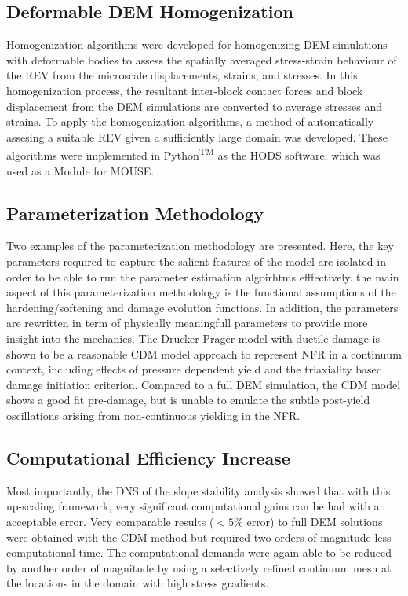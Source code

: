 \subsection*{Deformable DEM Homogenization}

Homogenization algorithms were developed for homogenizing DEM simulations with deformable bodies to assess the spatially averaged stress-strain behaviour of the REV from the microscale displacements, strains, and stresses. In this homogenization process, the resultant inter-block contact forces and block displacement from the DEM simulations are converted to average stresses and strains. To apply the homogenization algorithms, a method of automatically assesing a suitable REV given a sufficiently large domain was developed. These algorithms were implemented in Python\textsuperscript{TM} as the HODS software, which was used as a Module for MOUSE.

\subsection*{Parameterization Methodology}

Two examples of the parameterization methodology are presented. Here, the key parameters required to capture the salient features of the model are isolated in order to be able to run the parameter estimation algoirhtms efffectively. the main aspect of this parameterization methodology is the functional assumptions of the hardening/softening and damage evolution functions. In addition, the parameters are rewritten in term of physically meaningfull parameters to provide more insight into the mechanics. The Drucker-Prager model with ductile damage is shown to be a reasonable CDM model approach to represent NFR in a continuum context, including effects of pressure dependent yield and the triaxiality based damage initiation criterion. Compared to a full DEM simulation, the CDM model shows a good fit pre-damage, but is unable to emulate the subtle post-yield oscillations arising from non-continuous yielding in the NFR.

\subsection*{Computational Efficiency Increase}

Most importantly, the DNS of the slope stability analysis showed that with this up-scaling framework, very significant computational gains can be had with an acceptable error. Very comparable results ($<5\%$ error) to full DEM solutions were obtained with the CDM method but required two orders of magnitude less computational time. The computational demands were again able to be reduced by another order of magnitude by using a selectively refined continuum mesh at the locations in the domain with high stress gradients.

